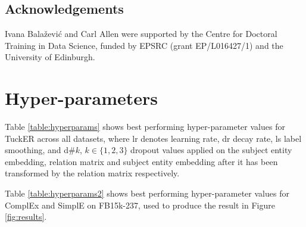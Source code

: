 \documentclass[11pt,a4paper]{article}
\begin{document}
\subsection*{Acknowledgements}
Ivana Bala\v{z}evi\'c and Carl Allen were supported by the Centre for Doctoral Training in Data Science, funded by EPSRC (grant EP/L016427/1) and the University of Edinburgh.





\clearpage
\appendix

\section{Hyper-parameters}
\label{sec:hyperparams}

Table \ref{table:hyperparams} shows best performing hyper-parameter values for TuckER across all datasets, where lr denotes learning rate, dr decay rate, ls label smoothing, and d\#$k$, $k \in \{1, 2, 3\}$ dropout values applied on the subject entity embedding, relation matrix and subject entity embedding after it has been transformed by the relation matrix respectively.

\begin{table}[!htbp]
\centering
{}
  \caption{Best performing hyper-parameter values for TuckER across all datasets.}
    \label{table:hyperparams}
\end{table}

Table \ref{table:hyperparams2} shows best performing hyper-parameter values for ComplEx and SimplE on FB15k-237, used to produce the result in Figure \ref{fig:results}.

\begin{table}[!htbp]
\centering
{}
  \caption{Best performing hyper-parameter values for ComplEx and SimplE on FB15k-237.}
    \label{table:hyperparams2}
\end{table}
\end{document}
